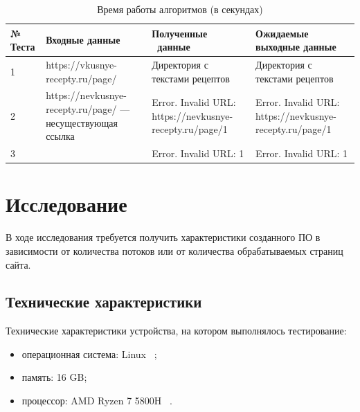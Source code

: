 \begin{table}[h]
	\begin{center}
		\begin{threeparttable}
		\captionsetup{justification=raggedright,singlelinecheck=off}
		\caption{Время работы алгоритмов (в секундах)}
		\label{tbl:time_measurements}
                        \begin{tabular}{|p{4cm}|p{4cm}|p{4cm}|p{4cm}|}
                            \hline
                            № Теста & Входные данные & Полученные \ данные & Ожидаемые выходные данные \\
                            \hline
                            1 & https://vkusnye-recepty.ru/page/ & Директория с текстами рецептов &
                            Директория с текстами рецептов \\
                            \hline
                            2 & https://nevkusnye-recepty.ru/page/ --- несуществующая ссылка
                              & Error. Invalid URL: https://nevkusnye-recepty.ru/page/1 &
                            Error. Invalid URL: https://nevkusnye-recepty.ru/page/1 \\
                            \hline
                            3 &  & Error. Invalid URL: 1 &
                            Error. Invalid URL: 1 \\
                            \hline

                        \end{tabular}
		\end{threeparttable}
    \end{center}
\end{table}

\section{Исследование}
В ходе исследования требуется получить характеристики созданного ПО в зависимости
от количества потоков или от количества обрабатываемых страниц сайта.

\subsection{Технические характеристики}
Технические характеристики устройства, на котором выполнялось тестирование:
\begin{itemize}
    \item операционная система: Linux ~\cite{bib1};
    \item память: 16 GB;
    \item процессор: AMD Ryzen 7 5800H ~\cite{bib2, bib3}.
\end{itemize}

